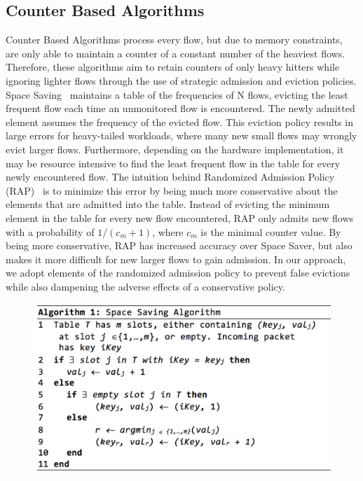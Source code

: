 \subsection{Counter Based Algorithms}
Counter Based Algorithms process every flow, but due to memory constraints, are only able to maintain a counter of a constant number of the heaviest flows. Therefore, these algorithms aim to retain counters of only heavy hitters while ignoring lighter flows through the use of strategic admission and eviction policies. Space Saving~\cite{spacesaving} maintains a table of the frequencies of N flows, evicting the least frequent flow each time an unmonitored flow is encountered. The newly admitted element assumes the frequency of the evicted flow. This eviction policy results in large errors for heavy-tailed workloads, where many new small flows may wrongly evict larger flows. Furthermore, depending on the hardware implementation, it may be resource intensive to find the least frequent flow in the table for every newly encountered flow. 
The intuition behind Randomized Admission Policy (RAP)~\cite{rap} is to minimize this error by being much more conservative about the elements that are admitted into the table. Instead of evicting the minimum element in the table for every new flow encountered, RAP only admits new flows with a probability of $1/(c_m + 1)$, where $c_m$ is the minimal counter value. By being more conservative, RAP has increased accuracy over Space Saver, but also makes it more difficult for new larger flows to gain admission. In our approach, we adopt elements of the randomized admission policy to prevent false evictions while also dampening the adverse effects of a conservative policy. 

\begin{figure}[t]
  \centering
    \includegraphics[scale=0.5]{alg1}
     \label{fig:bp-image}
\end{figure}

